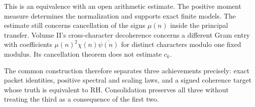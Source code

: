 This is an equivalence with an open arithmetic estimate. The positive moment measure determines the normalization and supports exact finite models. The estimate still concerns cancellation of the signs $\mu(n)$ inside the principal transfer. Volume II's cross-character decoherence concerns a different Gram entry with coefficients $\mu(n)^2\chi(n)\overline{\psi(n)}$ for distinct characters modulo one fixed modulus. Its cancellation theorem does not estimate $c_k$.

The common construction therefore separates three achievements precisely: exact packet identities, positive spectral and scaling laws, and a signed coherence target whose truth is equivalent to RH. Consolidation preserves all three without treating the third as a consequence of the first two.
